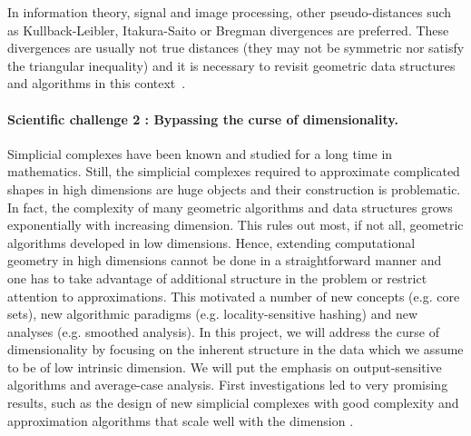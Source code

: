 In information theory, signal and image processing, other pseudo-distances such as Kullback-Leibler, Itakura-Saito or Bregman divergences are preferred.  
These divergences are usually not true distances (they may not be symmetric nor satisfy the triangular inequality) and it is necessary to revisit geometric data structures and algorithms in this context~\cite{geometrica-6154a}.




\paragraph{Scientific challenge 2 :  Bypassing the curse of dimensionality.} 
Simplicial complexes have been known and studied for a long time in mathematics.  Still, the simplicial complexes required to approximate complicated shapes in high dimensions are huge objects and their construction is problematic. In fact, the complexity of many geometric algorithms and data structures grows exponentially with increasing dimension. %
This rules out most, if not all, geometric algorithms developed in low dimensions.  Hence, extending computational geometry in high dimensions cannot be done in a straightforward manner and one has to take advantage of additional structure in the problem or restrict attention to approximations. This motivated a number of new concepts (e.g. core sets), new algorithmic paradigms (e.g. locality-sensitive hashing) and new analyses (e.g. smoothed analysis).  In this project, we will address the curse of dimensionality by focusing on the inherent structure in the data which we assume to be of low intrinsic dimension.  We will put the emphasis on output-sensitive algorithms and average-case analysis.  First investigations led to very promising results, such as the design of new simplicial complexes with good complexity and approximation algorithms that scale well with the dimension \cite{geometrica-7142i,cds-tewc-2004}.



